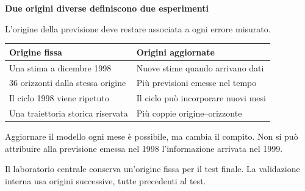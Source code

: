 \documentclass[12pt,aspectratio=1610]{beamer}
\newcommand{\PBody}[1]{\par{\fontsize{11.3}{14.8}\selectfont #1\par}}
\newcommand{\PSmall}[1]{\par{\fontsize{9.8}{13.1}\selectfont #1\par}}
\newcommand{\PInfo}[1]{%
\begin{tcolorbox}[enhanced,arc=1.6mm,boxrule=.55pt,colback=GeoTint,
 colframe=Rule!80!Classical,left=2.3mm,right=2.3mm,top=2mm,bottom=2mm,
 before skip=1mm,after skip=1mm]
\PSmall{#1}\end{tcolorbox}}
\begin{document}
\begin{frame}[plain]\hypertarget{slide20}{}
\begin{lrbox}{\TitleBox}
\begin{minipage}[t]{17.7cm}\raggedright\color{Ink}\fontsize{11.3}{14.8}\selectfont
\color{Navy}\bfseries\fontsize{20.6}{24.5}\selectfont Due origini diverse definiscono due esperimenti
\end{minipage}\end{lrbox}

\begin{lrbox}{\RecallBox}
\begin{minipage}[t]{14.3cm}\raggedright\color{Ink}\fontsize{11.3}{14.8}\selectfont
\fontsize{10.3}{13.8}\selectfont L’origine della previsione deve restare associata a ogni errore misurato.
\end{minipage}\end{lrbox}

\begin{lrbox}{\PilotLeftBox}
\begin{minipage}[t]{10.05cm}\raggedright\color{Ink}\fontsize{11.3}{14.8}\selectfont
{\fontsize{10.2}{13.1}\selectfont\renewcommand{\arraystretch}{1.45}\begin{tabular}{@{}p{4.5cm}p{4.5cm}@{}}\toprule
\textbf{Origine fissa} & \textbf{Origini aggiornate}\\\midrule
Una stima a dicembre 1998 & Nuove stime quando arrivano dati\\
36 orizzonti dalla stessa origine & Più previsioni emesse nel tempo\\
Il ciclo 1998 viene ripetuto & Il ciclo può incorporare nuovi mesi\\
Una traiettoria storica riservata & Più coppie origine--orizzonte\\
\bottomrule\end{tabular}}

\end{minipage}\end{lrbox}

\begin{lrbox}{\PilotRightBox}
\begin{minipage}[t]{7.55cm}\raggedright\color{Ink}\fontsize{11.3}{14.8}\selectfont
\PBody{Aggiornare il modello ogni mese è possibile, ma cambia il compito. Non si può attribuire alla previsione emessa nel 1998 l’informazione arrivata nel 1999.}
\vspace{2.5mm}
\PInfo{Il laboratorio centrale conserva un’origine fissa per il test finale. La validazione interna usa origini successive, tutte precedenti al test.}


\end{minipage}
\end{lrbox}
\end{frame}
\end{document}
